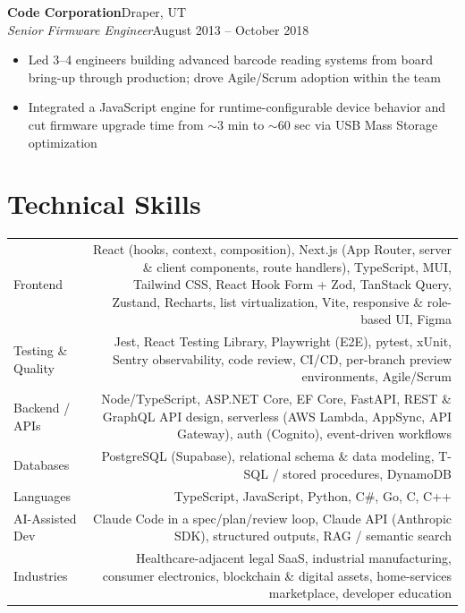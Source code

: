 \documentclass[10.5pt, letterpaper]{article}
\newcommand{\jobentry}[4]{%
  \noindent
  \textbf{\color{accent}#1}\hfill\textcolor{muted}{\small #2}\\
  \textit{#3}\hfill\textcolor{muted}{\small #4}%
}
\begin{document}
\vspace{5pt}

\jobentry{Code Corporation}{Draper, UT}{Senior Firmware Engineer}{August 2013 -- October 2018}
\begin{itemize}
  \item Led 3--4 engineers building advanced barcode reading systems from board
        bring-up through production; drove Agile/Scrum adoption within the team
  \item Integrated a JavaScript engine for runtime-configurable device behavior and
        cut firmware upgrade time from $\sim$3 min to $\sim$60 sec via USB Mass
        Storage optimization
\end{itemize}

\section{Technical Skills}

\begin{tabularx}{\linewidth}{@{}LR@{}}
  Frontend           & React (hooks, context, composition), Next.js (App Router,
                       server \& client components, route handlers), TypeScript,
                       MUI, Tailwind CSS, React Hook Form + Zod, TanStack Query,
                       Zustand, Recharts, list virtualization, Vite, responsive
                       \& role-based UI, Figma \\[3pt]
  Testing \& Quality & Jest, React Testing Library, Playwright (E2E), pytest, xUnit,
                       Sentry observability, code review, CI/CD, per-branch preview
                       environments, Agile/Scrum \\[3pt]
  Backend / APIs     & Node/TypeScript, ASP.NET Core, EF Core, FastAPI, REST \&
                       GraphQL API design, serverless (AWS Lambda, AppSync, API
                       Gateway), auth (Cognito), event-driven workflows \\[3pt]
  Databases          & PostgreSQL (Supabase), relational schema \& data modeling,
                       T-SQL / stored procedures, DynamoDB \\[3pt]
  Languages          & TypeScript, JavaScript, Python, C\#, Go, C, C++ \\[3pt]
  AI-Assisted Dev    & Claude Code in a spec/plan/review loop, Claude API (Anthropic
                       SDK), structured outputs, RAG / semantic search \\[3pt]
  Industries         & Healthcare-adjacent legal SaaS, industrial manufacturing,
                       consumer electronics, blockchain \& digital assets,
                       home-services marketplace, developer education \\[3pt]
\end{tabularx}
\end{document}
